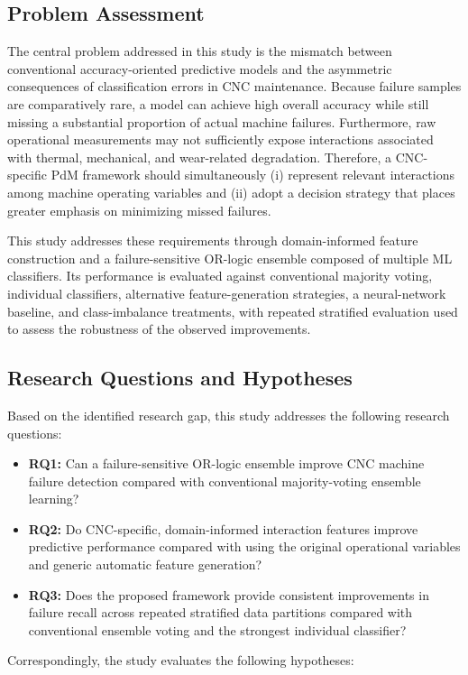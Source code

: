 \documentclass[final,5p, twocolumn]{elsarticle}
\begin{document}
\subsection{Problem Assessment}

The central problem addressed in this study is the mismatch between conventional accuracy-oriented predictive models and the asymmetric consequences of classification errors in CNC maintenance. Because failure samples are comparatively rare, a model can achieve high overall accuracy while still missing a substantial proportion of actual machine failures. Furthermore, raw operational measurements may not sufficiently expose interactions associated with thermal, mechanical, and wear-related degradation. Therefore, a CNC-specific PdM framework should simultaneously (i) represent relevant interactions among machine operating variables and (ii) adopt a decision strategy that places greater emphasis on minimizing missed failures.

This study addresses these requirements through domain-informed feature construction and a failure-sensitive OR-logic ensemble composed of multiple ML classifiers. Its performance is evaluated against conventional majority voting, individual classifiers, alternative feature-generation strategies, a neural-network baseline, and class-imbalance treatments, with repeated stratified evaluation used to assess the robustness of the observed improvements.

\subsection{Research Questions and Hypotheses}

Based on the identified research gap, this study addresses the following research questions:

\begin{itemize}
\item \textbf{RQ1:} Can a failure-sensitive OR-logic ensemble improve CNC machine failure detection compared with conventional majority-voting ensemble learning?
\item \textbf{RQ2:} Do CNC-specific, domain-informed interaction features improve predictive performance compared with using the original operational variables and generic automatic feature generation?

\item \textbf{RQ3:} Does the proposed framework provide consistent improvements in failure recall across repeated stratified data partitions compared with conventional ensemble voting and the strongest individual classifier?
\end{itemize}
Correspondingly, the study evaluates the following hypotheses:
\end{document}
